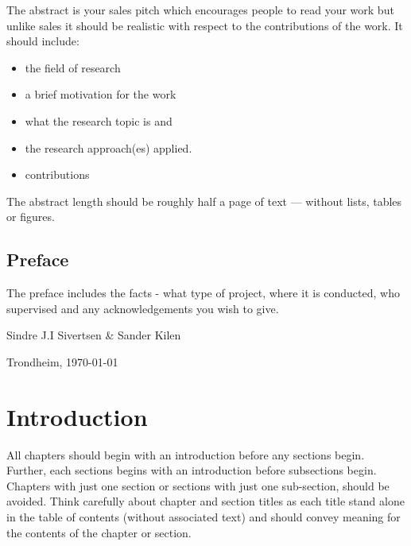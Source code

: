 \documentclass[a4paper]{book}
\newcommand{\thesisAuthor}{Sindre J.I Sivertsen \& Sander Kilen}
\begin{document}
The abstract is your sales pitch which encourages people to read your work but unlike sales it should be realistic with respect to the contributions of the work. It should include:
\begin{itemize}
    \item the field of research
    \item a brief motivation for the work
    \item what the research topic is and
    \item the research approach(es) applied.
    \item contributions
\end{itemize}

The abstract length should be roughly half a page of text --- without lists, tables or figures.

\clearpage

\section*{Preface}



\vspace{1cm}

The preface includes the facts - what type of project, where it is conducted, who supervised and any acknowledgements you wish to give.

\vfill

\hfill \thesisAuthor

\hfill Trondheim, \today

\clearpage

\tableofcontents

\listoffigures

\listoftables

\mainmatter

\chapter{Introduction}
\label{cha:Introduction}



All chapters should begin with an introduction before any sections begin. Further, each sections begins with an introduction before  subsections begin. Chapters with just one section or sections with just one sub-section, should be avoided. Think carefully about chapter and section titles as each title stand alone in the table of contents (without associated text) and should convey meaning for the contents of the chapter or section.
\end{document}
